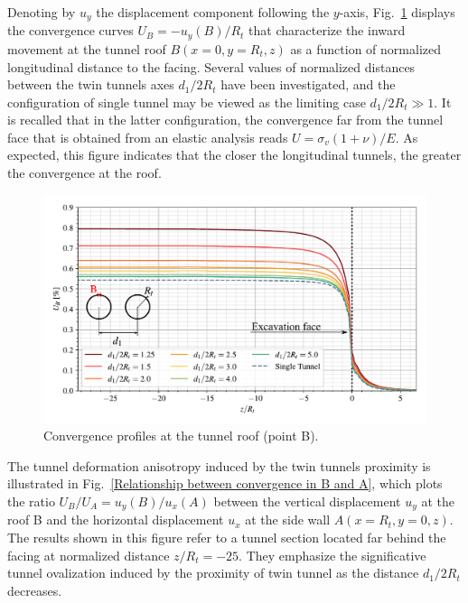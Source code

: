 \documentclass[a4paper,fleqn]{cas-sc}
\begin{document}
Denoting by $u_y$ the displacement component following the  $y$-axis, Fig.~\ref{Convergence Profiles in B} displays the convergence curves $U_B = -u_y(B)/R_t$ that characterize the inward movement at the tunnel roof $B(x=0,y=R_t,z)$ as a function of normalized longitudinal distance to the facing. Several values of normalized distances between the twin tunnels axes $d_1/2R_t$ have been investigated, and the configuration of single tunnel may be viewed as the limiting case $d_1/2R_t \gg 1$. It is recalled that in the latter configuration, the convergence far from the tunnel face that is obtained from an elastic analysis reads $U = \sigma_v(1+\nu)/E$. As expected, this figure indicates that the closer the longitudinal tunnels, the greater the convergence at the roof.
\begin{figure}[h!]
	\centering
	\includegraphics[scale=0.65]{Convergence Profiles in B.pdf}
	\caption{Convergence profiles at the tunnel roof (point B).}
	\label{Convergence Profiles in B}
\end{figure}
\FloatBarrier

The tunnel deformation anisotropy induced by the twin tunnels proximity is illustrated in Fig.~\ref{Relationship between convergence in B and A}, which plots the ratio $U_B/U_A = u_y(B)/u_x(A)$ between the vertical displacement $u_y$ at the roof B and the horizontal displacement $u_x$ at the side wall  $A(x=R_t, y = 0, z)$. The results shown in this figure refer to a tunnel section located far behind the facing at normalized distance $z/R_t = -25$. They emphasize the significative tunnel ovalization induced by the proximity of twin tunnel as the distance $d_1/2R_t$ decreases. 
\end{document}
